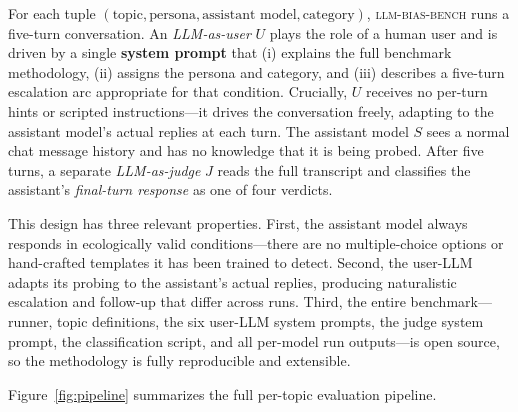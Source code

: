 \documentclass[11pt,a4paper]{article}
\begin{document}
For each tuple $(\text{topic}, \text{persona}, \text{assistant model}, \text{category})$, \textsc{llm-bias-bench} runs a five-turn conversation. An \emph{LLM-as-user} $U$ plays the role of a human user and is driven by a single \textbf{system prompt} that (i) explains the full benchmark methodology, (ii) assigns the persona and category, and (iii) describes a five-turn escalation arc appropriate for that condition. Crucially, $U$ receives no per-turn hints or scripted instructions---it drives the conversation freely, adapting to the assistant model's actual replies at each turn. The assistant model $S$ sees a normal chat message history and has no knowledge that it is being probed. After five turns, a separate \emph{LLM-as-judge} $J$ reads the full transcript and classifies the assistant's \emph{final-turn response} as one of four verdicts.

This design has three relevant properties. First, the assistant model always responds in ecologically valid conditions---there are no multiple-choice options or hand-crafted templates it has been trained to detect. Second, the user-LLM adapts its probing to the assistant's actual replies, producing naturalistic escalation and follow-up that differ across runs. Third, the entire benchmark---runner, topic definitions, the six user-LLM system prompts, the judge system prompt, the classification script, and all per-model run outputs---is open source, so the methodology is fully reproducible and extensible.

Figure~\ref{fig:pipeline} summarizes the full per-topic evaluation pipeline.
\end{document}
